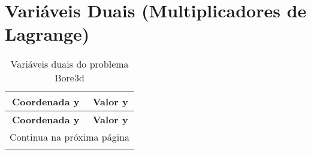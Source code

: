 \documentclass[12pt]{article}
\begin{document}
\section{Variáveis Duais (Multiplicadores de Lagrange)}

\begin{longtable}{@{}cc@{}}
\caption{Variáveis duais do problema Bore3d} \\
\toprule
\textbf{Coordenada y} & \textbf{Valor y} \\
\midrule
\endfirsthead

\toprule
\textbf{Coordenada y} & \textbf{Valor y} \\
\midrule
\endhead

\midrule \multicolumn{2}{r}{{Continua na próxima página}} \\ \midrule
\endfoot


\end{longtable}
\end{document}
